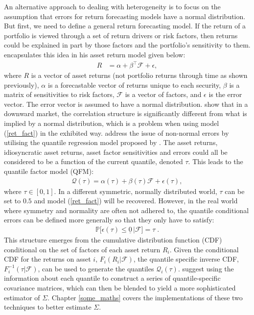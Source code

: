 \documentclass[a4paper,11pt,nocenter,bold,noupper,headcount]{mythesis}
\theoremstyle{plain}
\theoremstyle{definition}
\begin{document}
An alternative approach to dealing with heterogeneity is to focus on the assumption that errors for return forecasting models have a normal distribution. But first, we need to define a general return forecasting model. If the return of a portfolio is viewed through a set of return drivers or risk factors, then returns could be explained in part by those factors and the portfolio's sensitivity to them. \cite{M10} encapsulates this idea in his asset return model given below:
\begin{align} \label{ret_fact}
R &= \alpha +\beta^\intercal \mathcal{F} + \epsilon, 
\end{align}
where $R$ is a vector of asset returns (not portfolio returns through time as shown previously), $\alpha$ is a forecastable vector of returns unique to each security, $\beta$ is a matrix of sensitivities to risk factors, $\mathcal{F}$ is a vector of factors, and $\epsilon$ is the error vector. The error vector is assumed to have a normal distribution. \cite{AC02} show that in a downward market, the correlation structure is significantly different from what is implied by a normal distribution, which is a problem when using model (\ref{ret_fact}) in the exhibited way. \cite{CDG19} address the issue of non-normal errors by utilising the quantile regression model proposed by \cite{KB78}. The asset returns, idiosyncratic asset returns, asset factor sensitivities and errors could all be considered to be a function of the current quantile, denoted $\tau$. This leads to the quantile factor model (QFM):
\begin{align} \label{qfm}
\mathcal{Q}(\tau) =  \alpha(\tau) + \beta(\tau)\mathcal{F} + \epsilon(\tau),
\end{align}
where $ \tau \in [0, 1]$. In a different symmetric, normally distributed world, $\tau$ can be set to $0.5$ and model (\ref{ret_fact}) will be recovered. However, in the real world where symmetry and normality are often not adhered to, the quantile conditional errors can be defined more generally so that they only have to satisfy:
\begin{align}
\mathbb{P}\Big[\epsilon(\tau) \leq \underline{0} \, \Big | \mathcal{F} \Big] = \tau \; .
\end{align}
This structure emerges from the cumulative distribution function (CDF) conditional on the set of factors of each asset return $R_i$. Given the conditional CDF for the returns on asset $i$, $F_i(R_i|\mathcal{F})$, the quantile specific inverse CDF, $F^{-1}_i(\tau| \mathcal{F})$, can be used to generate the quantiles $\mathcal{Q}_i(\tau)$. \cite{FD18} suggest using the information about each quantile to construct a series of quantile-specific covariance matrices, which can then be blended to yield a more sophisticated estimator of $\Sigma$. Chapter \ref{some_maths} covers the implementations of these two techniques to better estimate $\Sigma$.
\end{document}
